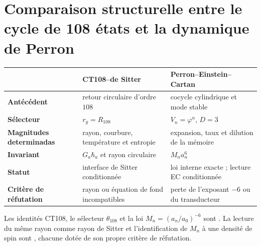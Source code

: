 \section{Comparaison structurelle entre le cycle de 108 états et la dynamique de Perron}

\begin{center}
\begin{tabularx}{\textwidth}{>{\bfseries}p{29mm}XX}
\toprule
& CT108--de Sitter & Perron--Einstein--Cartan\\
\midrule
Antécédent & retour circulaire d’ordre \(108\) & cocycle cylindrique et mode stable\\
Sélecteur & \(r_g=R_{108}\) & \(V_n=\varphi^n\), \(D=3\)\\
Magnitudes determinadas & rayon, courbure, température et entropie & expansion, taux et dilution de la mémoire\\
Invariant & \(G_a\hbar_a\) et rayon circulaire & \(M_na_n^6\)\\
Statut & interface de Sitter conditionnée & loi interne exacte ; lecture EC conditionnée\\
Critère de réfutation & rayon ou équation de fond incompatibles & perte de l’exposant \(-6\) ou du transducteur\\
\bottomrule
\end{tabularx}
\end{center}

\begin{statusbox}
Les identités CT108, le sélecteur \(\theta_{108}\) et la loi \(M_n=(a_n/a_0)^{-6}\) sont . La lecture du même rayon comme rayon de Sitter et l’identification de \(M_n\) à une densité de spin sont
, chacune dotée de son propre critère de réfutation.
\end{statusbox}
